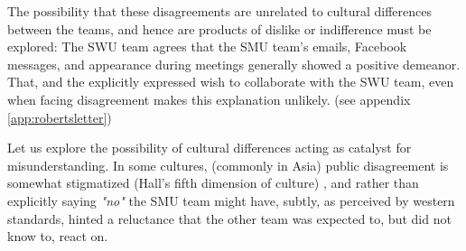 The possibility that these disagreements are unrelated to cultural differences
between the teams, and hence are products of dislike or indifference must be
explored: The SWU team agrees that the SMU team's emails, Facebook messages,
and appearance during meetings generally showed a positive demeanor. That, and
the explicitly expressed wish to collaborate with the SWU team, even when
facing disagreement makes this explanation unlikely. (see
appendix \ref{app:robertsletter})

Let us explore the possibility of cultural differences acting as catalyst for
misunderstanding. In some cultures, (commonly in Asia) public disagreement is
somewhat stigmatized (Hall's fifth dimension of culture\cite{surprises})
\cite{herbsiemens}, and rather than explicitly saying \emph{"no"} the SMU team
might have, subtly, as perceived by western standards, hinted a reluctance that
the other team was expected to, but did not know to, react on.

